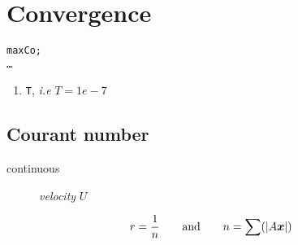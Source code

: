 
\section{Convergence}

\begin{center}
	\texttt{maxCo;}\\
	\texttt{\dots}
\end{center}

\begin{enumerate}
	\item \texttt{T}, \emph{i.e} $T=1e-7$ 
\end{enumerate}

\subsection{Courant number}

\begin{description}
        \item[continuous] \emph{velocity} $U$
\end{description}

\[
\label{eq:res}
r=\frac{1}{n}\qquad\text{and}\qquad n=\sum(\lvert A\boldsymbol{x}\rvert)
\]

\begin{comment}
\begin{figure}
\centering
\texttt{[image: images/residuals]}
\caption{Residuals}
\label{fig:res}
\end{figure}
\end{comment}

